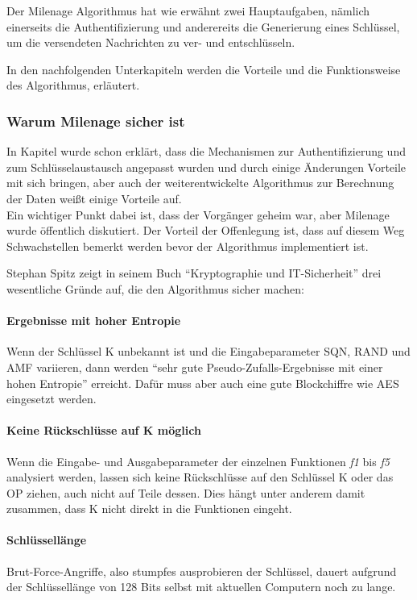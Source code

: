 Der Milenage Algorithmus hat wie erwähnt zwei Hauptaufgaben, nämlich einerseits die
Authentifizierung und anderereits die Generierung eines Schlüssel, um die versendeten Nachrichten zu
ver- und entschlüsseln.

In den nachfolgenden Unterkapiteln werden die Vorteile und die Funktionsweise des
Algorithmus, erläutert.

 \subsubsection[Warum Milenage sicher ist (Heumann)]{Warum Milenage sicher ist}
 In Kapitel  wurde schon erklärt, dass die Mechanismen
 zur Authentifizierung und zum Schlüsselaustausch angepasst wurden und durch einige
 Änderungen Vorteile mit sich bringen, aber auch der weiterentwickelte Algorithmus zur
 Berechnung der Daten weißt einige Vorteile auf. \\
 Ein wichtiger Punkt dabei ist, dass der Vorgänger geheim war, aber Milenage wurde öffentlich
 diskutiert. Der Vorteil der Offenlegung ist, dass auf diesem Weg Schwachstellen bemerkt werden
 bevor der Algorithmus implementiert ist. 
 
 Stephan Spitz zeigt in seinem Buch ``Kryptographie und IT-Sicherheit'' \cite{spitz11} drei
 wesentliche Gründe auf, die den Algorithmus sicher machen:
 
 \paragraph{Ergebnisse mit hoher Entropie}
 Wenn der Schlüssel K unbekannt ist und die Eingabeparameter \ac{SQN}, RAND
 und \ac{AMF} variieren, dann werden ``sehr gute Pseudo-Zufalls-Ergebnisse mit einer hohen
 Entropie'' \cite{spitz11} erreicht. Dafür muss aber auch eine gute Blockchiffre wie AES
 eingesetzt werden.
 
 \paragraph{Keine Rückschlüsse auf K möglich}
 Wenn die Eingabe- und Ausgabeparameter der einzelnen Funktionen \emph{f1} bis \emph{f5}
 analysiert werden, lassen sich keine Rückschlüsse auf den Schlüssel K oder das \acf{OP}
 ziehen, auch nicht auf Teile dessen. Dies hängt unter anderem damit zusammen, dass K nicht
 direkt in die Funktionen eingeht.
 
 \paragraph{Schlüssellänge}
 Brut-Force-Angriffe, also stumpfes ausprobieren der Schlüssel, dauert aufgrund der
 Schlüssellänge von 128 Bits selbst mit aktuellen Computern noch zu lange.
 
